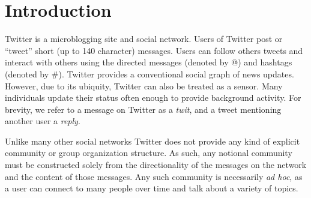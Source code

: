 \section{Introduction}

Twitter is a microblogging site and social network.  Users of Twitter post or ``tweet'' short (up to 140 character) messages.  Users can follow others tweets and interact with others using the directed messages (denoted by @) and hashtags (denoted by \#). Twitter provides a conventional social graph of news updates.  However, due to its ubiquity, Twitter can also be treated as a sensor.  Many individuals update their status often enough to provide background activity.  For brevity, we refer to a message on Twitter as a \emph{twit}, and a tweet mentioning another user a \emph{reply}.

Unlike many other social networks Twitter does not provide any kind of explicit community or group organization structure.  As such, any notional community must be constructed solely from the directionality of the messages on the network and the content of those messages.  Any such community is necessarily \emph{ad hoc}, as a user can connect to many people over time and talk about a variety of topics.
